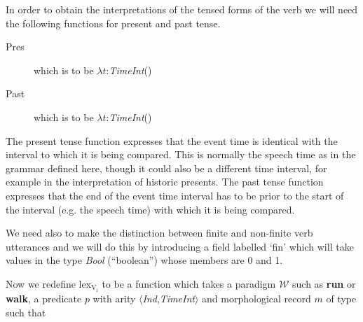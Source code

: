 In order to obtain the interpretations of the tensed forms of the verb
we will need the following functions for present and past tense.
\begin{description}

\item[Pres] which is to be $\lambda
  t$:\textit{TimeInt}()

\item[Past] which is to be $\lambda
  t$:\textit{TimeInt}()

\end{description}
\noindent The present tense function expresses that the event time is
identical with the interval to which it is being compared. This is normally
the speech time as in the grammar defined here, though it could also
be a different time interval, for example in the interpretation of
historic presents.  The past tense function expresses that the end of
the event time interval has to be prior to the start of the interval
(e.g. the speech time) with which it is being compared.

We need also to make the distinction between finite and non-finite
verb utterances and we will do this by introducing a field labelled
`fin' which will take values in the type \textit{Bool} (``boolean'')
whose members are 0 and 1.

Now we redefine lex$_{\mathrm{V_{\mathrm{i}}}}$ to be a function which
takes a paradigm $\mathcal{W}$ such as \textbf{\textsf{run}} or \textbf{\textsf{walk}}, a
predicate $p$ with arity
$\langle$\textit{Ind},\textit{TimeInt}$\rangle$ and morphological
record $m$ of type  such
that 

